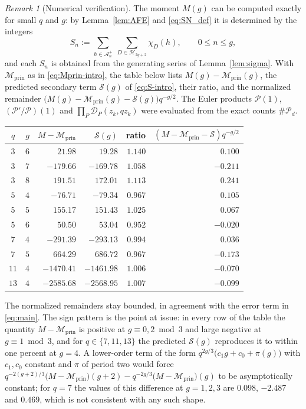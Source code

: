 \documentclass[a4paper,reqno]{amsart}
\numberwithin{equation}{section}
\theoremstyle{remark}
\newtheorem{remark}[theorem]{Remark}
\theoremstyle{definition}
\newcommand{\A}{\mathcal{A}}
\begin{document}
\begin{remark}[Numerical verification]\label{rem:numerics}
The moment $M(g)$ can be computed exactly for small $q$ and $g$: by
Lemma~\ref{lem:AFE} and \eqref{eq:SN_def} it is determined by the integers
$$
S_n:=\sum_{h\in\A_n^+}\ \sum_{D\in\mathcal H_{2g+2}}\chi_D(h),
\qquad 0\le n\le g,
$$
and each $S_n$ is obtained from the generating series of
Lemma~\ref{lem:sigma}. With
$\mathcal M_{\mathrm{prin}}$ as in \eqref{eq:Mprin-intro}, the table below lists
$M(g)-\mathcal M_{\mathrm{prin}}(g)$, the predicted secondary term
$\mathcal S(g)$ of \eqref{eq:S-intro}, their ratio, and the normalized
remainder $\bigl(M(g)-\mathcal M_{\mathrm{prin}}(g)-\mathcal S(g)\bigr)q^{-g/2}$.
The Euler products $\mathscr P(1)$, $(\mathscr P'/\mathscr P)(1)$ and
$\prod_P\mathcal D_P(z_k,qz_k)$ were evaluated from the exact counts
$\#\mathcal P_d$.

\begin{center}
\renewcommand{\arraystretch}{1.15}
\begin{tabular}{c c r r r r}
$q$ & $g$ & $M-\mathcal M_{\mathrm{prin}}$ & $\mathcal S(g)$ & ratio &
$(M-\mathcal M_{\mathrm{prin}}-\mathcal S)q^{-g/2}$\\
\hline
$3$ & $6$ & $21.98$ & $19.28$ & $1.140$ & $0.100$\\
$3$ & $7$ & $-179.66$ & $-169.78$ & $1.058$ & $-0.211$\\
$3$ & $8$ & $191.51$ & $172.01$ & $1.113$ & $0.241$\\
$5$ & $4$ & $-76.71$ & $-79.34$ & $0.967$ & $0.105$\\
$5$ & $5$ & $155.17$ & $151.43$ & $1.025$ & $0.067$\\
$5$ & $6$ & $50.50$ & $53.04$ & $0.952$ & $-0.020$\\
$7$ & $4$ & $-291.39$ & $-293.13$ & $0.994$ & $0.036$\\
$7$ & $5$ & $664.29$ & $686.72$ & $0.967$ & $-0.173$\\
$11$ & $4$ & $-1470.41$ & $-1461.98$ & $1.006$ & $-0.070$\\
$13$ & $4$ & $-2585.68$ & $-2568.95$ & $1.007$ & $-0.099$\\
\end{tabular}
\end{center}

The normalized remainders stay bounded, in agreement with the error term in
\eqref{eq:main}. The sign pattern is the point at issue: in every row of the
table the quantity $M-\mathcal M_{\mathrm{prin}}$ is positive at
$g\equiv0,2\bmod 3$ and large negative at $g\equiv1\bmod3$, and for
$q\in\{7,11,13\}$ the predicted $\mathcal S(g)$ reproduces it to within one
percent at $g=4$.
A lower-order term of the form $q^{2g/3}\bigl(c_1 g+c_0+\pi(g)\bigr)$
with $c_1,c_0$ constant and $\pi$ of period two would force
$q^{-2(g+2)/3}\bigl(M-\mathcal M_{\mathrm{prin}}\bigr)(g+2)-
q^{-2g/3}\bigl(M-\mathcal M_{\mathrm{prin}}\bigr)(g)$ to be asymptotically
constant; for $q=7$ the values of this difference at $g=1,2,3$ are
$0.098$, $-2.487$ and $0.469$, which is not consistent with any such shape.
\end{remark}
\end{document}

